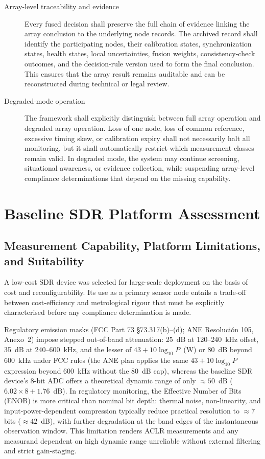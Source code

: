 \documentclass[11pt]{article}
\begin{document}
\begin{description}
\item[Array-level traceability and evidence] Every fused decision shall preserve the full chain of evidence linking the array conclusion to the underlying node records. The archived record shall identify the participating nodes, their calibration states, synchronization states, health states, local uncertainties, fusion weights, consistency-check outcomes, and the decision-rule version used to form the final conclusion. This ensures that the array result remains auditable and can be reconstructed during technical or legal review.

\item[Degraded-mode operation] The framework shall explicitly distinguish between full array operation and degraded array operation. Loss of one node, loss of common reference, excessive timing skew, or calibration expiry shall not necessarily halt all monitoring, but it shall automatically restrict which measurement classes remain valid. In degraded mode, the system may continue screening, situational awareness, or evidence collection, while suspending array-level compliance determinations that depend on the missing capability.

\end{description}

\section{Baseline SDR Platform Assessment}

\subsection*{Measurement Capability, Platform Limitations, and Suitability}

A low-cost SDR device was selected for large-scale deployment on the basis of cost and reconfigurability. Its use as a primary sensor node entails a trade-off between cost-efficiency and metrological rigour that must be explicitly characterised before any compliance determination is made.

Regulatory emission masks (FCC Part 73 \S73.317(b)--(d); ANE Resoluci\'on 105, Anexo~2) impose stepped out-of-band attenuation: 25~dB at 120--240~kHz offset, 35~dB at 240--600~kHz, and the lesser of $43 + 10\log_{10} P$~(W) or 80~dB beyond 600~kHz under FCC rules (the ANE plan applies the same $43 + 10\log_{10} P$ expression beyond 600~kHz without the 80~dB cap), whereas the baseline SDR device's 8-bit ADC offers a theoretical dynamic range of only $\approx 50$~dB ($6.02 \times 8 + 1.76$~dB). In regulatory monitoring, the Effective Number of Bits (ENOB) is more critical than nominal bit depth: thermal noise, non-linearity, and input-power-dependent compression typically reduce practical resolution to $\approx 7$ bits ($\approx 42$~dB), with further degradation at the band edges of the instantaneous observation window. This limitation renders ACLR measurements and any measurand dependent on high dynamic range unreliable without external filtering and strict gain-staging.
\end{document}
